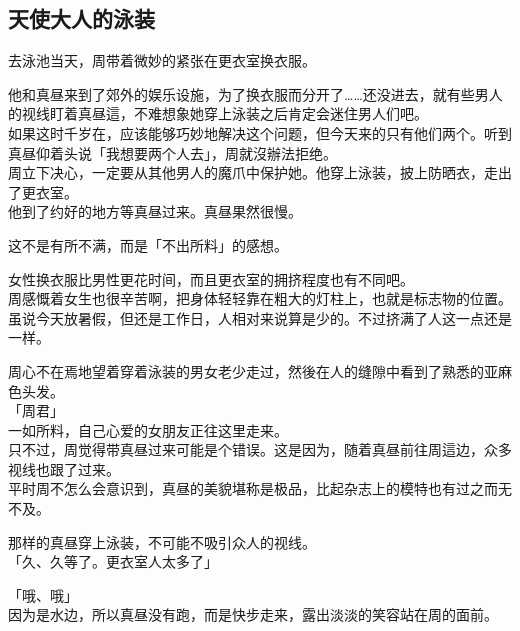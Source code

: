 \subsection{天使大人的泳装}

去泳池当天，周带着微妙的紧张在更衣室换衣服。

他和真昼来到了郊外的娱乐设施，为了换衣服而分开了……还没进去，就有些男人的视线盯着真昼這，不难想象她穿上泳装之后肯定会迷住男人们吧。\\%

如果这时千岁在，应该能够巧妙地解决这个问题，但今天来的只有他们两个。听到真昼仰着头说「我想要两个人去」，周就沒辦法拒绝。\\

周立下决心，一定要从其他男人的魔爪中保护她。他穿上泳装，披上防晒衣，走出了更衣室。\\

他到了约好的地方等真昼过来。真昼果然很慢。

这不是有所不满，而是「不出所料」的感想。

女性换衣服比男性更花时间，而且更衣室的拥挤程度也有不同吧。\\

周感慨着女生也很辛苦啊，把身体轻轻靠在粗大的灯柱上，也就是标志物的位置。\\

虽说今天放暑假，但还是工作日，人相对来说算是少的。不过挤满了人这一点还是一样。

周心不在焉地望着穿着泳装的男女老少走过，然後在人的缝隙中看到了熟悉的亚麻色头发。\\

「周君」\\

一如所料，自己心爱的女朋友正往这里走来。\\

只不过，周觉得带真昼过来可能是个错误。这是因为，随着真昼前往周這边，众多视线也跟了过来。\\

平时周不怎么会意识到，真昼的美貌堪称是极品，比起杂志上的模特也有过之而无不及。

那样的真昼穿上泳装，不可能不吸引众人的视线。\\

「久、久等了。更衣室人太多了」

「哦、哦」\\

因为是水边，所以真昼没有跑，而是快步走来，露出淡淡的笑容站在周的面前。\\

